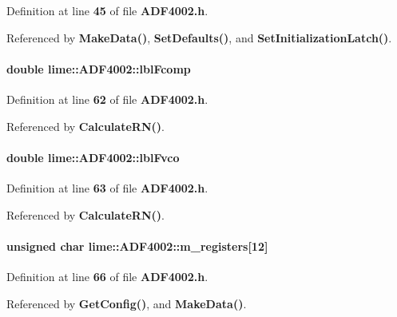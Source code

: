 Definition at line {\bf 45} of file {\bf A\+D\+F4002.\+h}.



Referenced by {\bf Make\+Data()}, {\bf Set\+Defaults()}, and {\bf Set\+Initialization\+Latch()}.

\paragraph[{lbl\+Fcomp}]{\setlength{\rightskip}{0pt plus 5cm}double lime\+::\+A\+D\+F4002\+::lbl\+Fcomp}\label{classlime_1_1ADF4002_a7c284e940b27331cb42ab141a451093c}


Definition at line {\bf 62} of file {\bf A\+D\+F4002.\+h}.



Referenced by {\bf Calculate\+R\+N()}.

\paragraph[{lbl\+Fvco}]{\setlength{\rightskip}{0pt plus 5cm}double lime\+::\+A\+D\+F4002\+::lbl\+Fvco}\label{classlime_1_1ADF4002_aa90e5f649dd9936b772f7673743a207b}


Definition at line {\bf 63} of file {\bf A\+D\+F4002.\+h}.



Referenced by {\bf Calculate\+R\+N()}.

\paragraph[{m\+\_\+registers}]{\setlength{\rightskip}{0pt plus 5cm}unsigned char lime\+::\+A\+D\+F4002\+::m\+\_\+registers[12]\hspace{0.3cm}{\ttfamily [protected]}}\label{classlime_1_1ADF4002_ad4abe1a589805fde8da437ac384ab340}


Definition at line {\bf 66} of file {\bf A\+D\+F4002.\+h}.



Referenced by {\bf Get\+Config()}, and {\bf Make\+Data()}.

